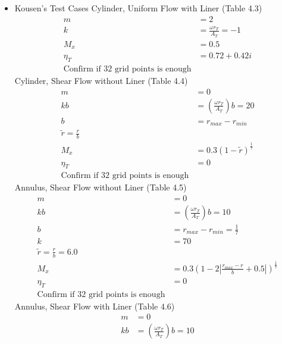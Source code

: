 \documentclass[a4paper]{report}
\begin{document}
\begin{outline}[enumerate]
    \begin{itemize}
        \item Kousen's Test Cases
            \subitem Cylinder, Uniform Flow with Liner (Table 4.3)
            \begin{align*}
                m &= 2 \\
                k &= \frac{\omega r_T}{A_T} = -1 \\
                M_x &= 0.5 \\
                \eta_T &= 0.72 + 0.42i\\
                \text{Confirm if 32 grid points is enough}
            \end{align*} 
            \subitem Cylinder, Shear Flow without Liner (Table 4.4)
            \begin{align*}
                m &= 0 \\
                kb &= \left(\frac{\omega r_T}{A_T}\right)b = 20 \\
                b &= r_{max} - r_{min} \\
                \tilde{r} = \frac{r}{b} \\
                M_x &= 0.3(1-\tilde{r})^{\frac{1}{7}} \\
                \eta_T &= 0\\
                \text{Confirm if 32 grid points is enough}
            \end{align*}
            \subitem Annulus, Shear Flow without Liner (Table 4.5)
            \begin{align*}
                m &= 0 \\
                kb &= \left(\frac{\omega r_T}{A_T}\right)b = 10 \\
                b &= r_{max} - r_{min}  = \frac{1}{7}\\
                k &= 70 \\
                \tilde{r} = \frac{r}{b} = 6.0 \\
                M_x &= 0.3\left(1 - 2 \left| \frac{r_{max}-r}{b} + 0.5 \right|  \right)^{\frac{1}{7}} \\
                \eta_T &= 0\\
                \text{Confirm if 32 grid points is enough}
            \end{align*}
            \subitem Annulus, Shear Flow with Liner (Table 4.6)
            \begin{align*}
                m &= 0 \\
                kb &= \left(\frac{\omega r_T}{A_T}\right)b = 10 \\

\end{align*}
\end{itemize}
\end{outline}
\end{document}
